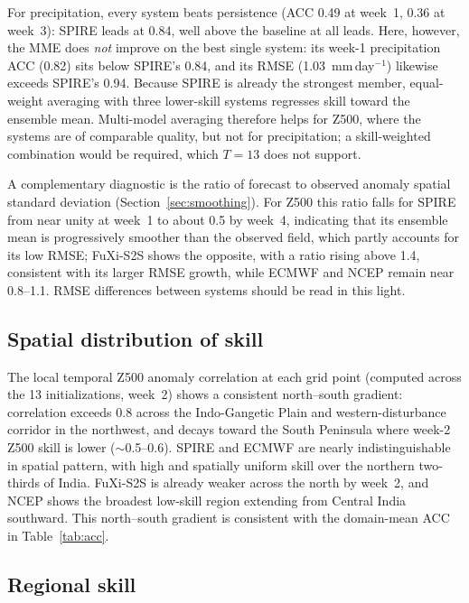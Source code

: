 \documentclass[11pt,a4paper]{article}
\begin{document}
For precipitation, every system beats persistence (ACC 0.49 at week~1,
0.36 at week~3): SPIRE leads at 0.84, well above the baseline at all
leads. Here, however, the MME does \emph{not} improve on the best single
system: its week-1 precipitation ACC (0.82) sits below SPIRE's 0.84,
and its RMSE (1.03~mm\,day$^{-1}$) likewise exceeds SPIRE's 0.94.
Because SPIRE is already the strongest member, equal-weight averaging
with three lower-skill systems regresses skill toward the ensemble mean.
Multi-model averaging therefore helps for Z500, where the systems are of
comparable quality, but not for precipitation; a skill-weighted
combination would be required, which $T=13$ does not support.

A complementary diagnostic is the ratio of forecast to observed
anomaly spatial standard deviation (Section~\ref{sec:smoothing}). For
Z500 this ratio falls for SPIRE from near unity at week~1 to about 0.5
by week~4, indicating that its ensemble mean is progressively smoother
than the observed field, which partly accounts for its low RMSE; FuXi-S2S
shows the opposite, with a ratio rising above 1.4, consistent with its
larger RMSE growth, while ECMWF and NCEP remain near 0.8--1.1. RMSE
differences between systems should be read in this light.

\subsection{Spatial distribution of skill}\label{sec:spatial_skill}

The local temporal Z500 anomaly correlation at each grid point (computed
across the 13 initializations, week~2) shows a consistent north--south
gradient: correlation exceeds 0.8 across the Indo-Gangetic Plain and
western-disturbance corridor in the northwest, and decays toward the
South Peninsula where week-2 Z500 skill is lower ($\sim$0.5--0.6).
SPIRE and ECMWF are nearly indistinguishable in spatial pattern, with
high and spatially uniform skill over the northern two-thirds of India.
FuXi-S2S is already weaker across the north by week~2, and NCEP shows
the broadest low-skill region extending from Central India southward.
This north--south gradient is consistent with the domain-mean ACC in
Table~\ref{tab:acc}.

\subsection{Regional skill}\label{sec:regional_skill}
\end{document}
